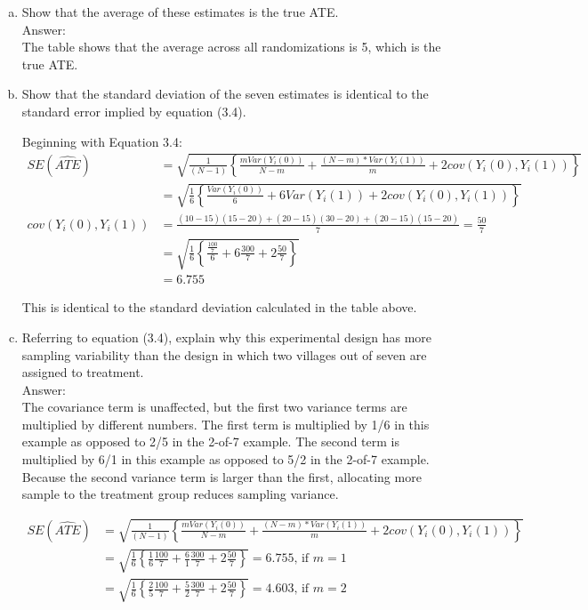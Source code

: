 \documentclass[11pt,notitlepage]{article}\usepackage[]{graphicx}\usepackage[]{color}
\begin{document}
\begin{enumerate}[a)]
\item Show that the average of these estimates is the true ATE.\\
Answer:\\
The table shows that the average across all randomizations is 5, which is the true ATE.
\item Show that the standard deviation of the seven estimates is identical to the standard error implied by equation (3.4).  

Beginning with Equation 3.4:
\begin{align*}
SE(\widehat{ATE}) &= \sqrt{\frac{1}{(N-1)} \left \{ \frac{mVar(Y_i (0))}{N- m} + \frac{(N-m)*Var(Y_i (1))}{m} + 2cov(Y_i(0), Y_i(1))\right \}} \\
&= \sqrt{\frac{1}{6} \left \{ \frac{Var(Y_i (0))}{6} + 6Var(Y_i (1)) + 2cov(Y_i(0), Y_i(1))\right \}} \\
cov(Y_i(0), Y_i(1)) &= \frac{(10-15)(15-20) + (20-15)(30-20) + (20-15)(15-20)}{7} = \frac{50}{7}\\
&= \sqrt{\frac{1}{6} \left \{ \frac{\frac{100}{7}}{6} + 6\frac{300}{7} + 2\frac{50}{7}\right \}} \\
&= 6.755
\end{align*}

This is identical to the standard deviation calculated in the table above.

\item Referring to equation (3.4), explain why this experimental design has more sampling variability than the design in which two villages out of seven are assigned to treatment.\\
Answer:\\
The covariance term is unaffected, but the first two variance terms are multiplied by different numbers. The first term is multiplied by 1/6 in this example as opposed to 2/5 in the 2-of-7 example. The second term is multiplied by 6/1 in this example as opposed to 5/2 in the 2-of-7 example. Because the second variance term is larger than the first, allocating more sample to the treatment group reduces sampling variance.

\begin{align*}
SE(\widehat{ATE}) &= \sqrt{\frac{1}{(N-1)} \left \{ \frac{mVar(Y_i (0))}{N- m} + \frac{(N-m)*Var(Y_i (1))}{m} + 2cov(Y_i(0), Y_i(1))\right \}} \\
&= \sqrt{\frac{1}{6} \left \{ \frac{1}{6}\frac{100}{7} + \frac{6}{1}\frac{300}{7} + 2\frac{50}{7}\right \}} = 6.755 \text{, if $m = 1$} \\
&= \sqrt{\frac{1}{6} \left \{ \frac{2}{5}\frac{100}{7} + \frac{5}{2}\frac{300}{7} + 2\frac{50}{7}\right \}} = 4.603 \text{, if $m = 2$} \\
\end{align*}


\end{enumerate}
\end{document}
